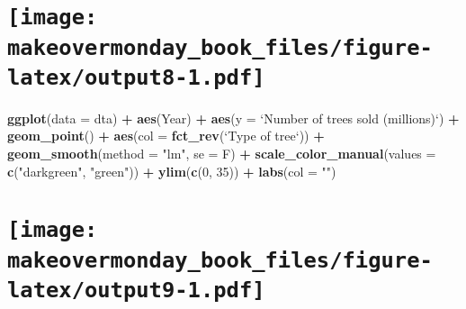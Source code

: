\documentclass[]{book}
\newenvironment{Shaded}{\begin{snugshade}}{\end{snugshade}}
\newcommand{\KeywordTok}[1]{\textcolor[rgb]{0.13,0.29,0.53}{\textbf{#1}}}
\newcommand{\DataTypeTok}[1]{\textcolor[rgb]{0.13,0.29,0.53}{#1}}
\newcommand{\DecValTok}[1]{\textcolor[rgb]{0.00,0.00,0.81}{#1}}
\newcommand{\StringTok}[1]{\textcolor[rgb]{0.31,0.60,0.02}{#1}}
\newcommand{\OperatorTok}[1]{\textcolor[rgb]{0.81,0.36,0.00}{\textbf{#1}}}
\newcommand{\NormalTok}[1]{#1}
\theoremstyle{definition}
\theoremstyle{definition}
\theoremstyle{definition}
\theoremstyle{remark}
\begin{document}
\section[]{\texorpdfstring{\protect\texttt{[image: makeovermonday\_book\_files/figure-latex/output8-1.pdf]}}{}}\label{section-17}

\clearpage

\begin{Shaded}
\begin{Highlighting}[]
\KeywordTok{ggplot}\NormalTok{(}\DataTypeTok{data =}\NormalTok{ dta) }\OperatorTok{+}
\StringTok{  }\KeywordTok{aes}\NormalTok{(Year) }\OperatorTok{+}
\StringTok{  }\KeywordTok{aes}\NormalTok{(}\DataTypeTok{y =} \StringTok{`}\DataTypeTok{Number of trees sold (millions)}\StringTok{`}\NormalTok{) }\OperatorTok{+}
\StringTok{  }\KeywordTok{geom_point}\NormalTok{() }\OperatorTok{+}
\StringTok{  }\KeywordTok{aes}\NormalTok{(}\DataTypeTok{col =} \KeywordTok{fct_rev}\NormalTok{(}\StringTok{`}\DataTypeTok{Type of tree}\StringTok{`}\NormalTok{)) }\OperatorTok{+}
\StringTok{  }\KeywordTok{geom_smooth}\NormalTok{(}\DataTypeTok{method =} \StringTok{"lm"}\NormalTok{, }\DataTypeTok{se =}\NormalTok{ F) }\OperatorTok{+}
\StringTok{  }\KeywordTok{scale_color_manual}\NormalTok{(}\DataTypeTok{values =} \KeywordTok{c}\NormalTok{(}\StringTok{"darkgreen"}\NormalTok{, }\StringTok{"green"}\NormalTok{)) }\OperatorTok{+}
\StringTok{  }\KeywordTok{ylim}\NormalTok{(}\KeywordTok{c}\NormalTok{(}\DecValTok{0}\NormalTok{, }\DecValTok{35}\NormalTok{)) }\OperatorTok{+}
\StringTok{  }\KeywordTok{labs}\NormalTok{(}\DataTypeTok{col =} \StringTok{""}\NormalTok{) }
\end{Highlighting}
\end{Shaded}

\section[]{\texorpdfstring{\protect\texttt{[image: makeovermonday\_book\_files/figure-latex/output9-1.pdf]}}{}}\label{section-18}

\clearpage
\end{document}
